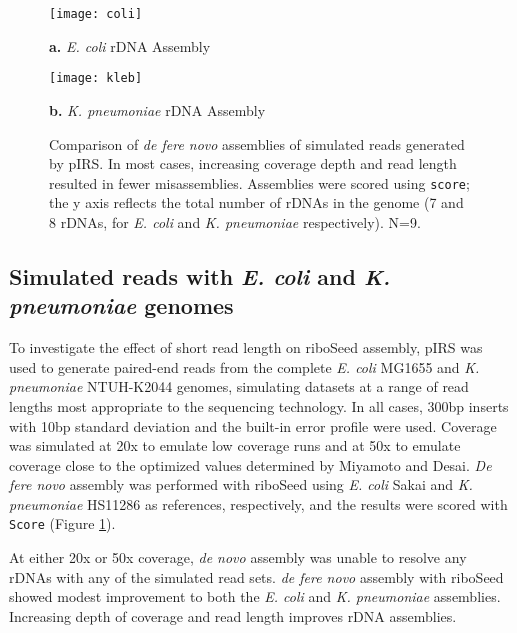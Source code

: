 \documentclass[a4,center,fleqn]{NAR}
\begin{document}
\begin{figure}[!ht]
  \centering
  \begin{minipage}{.45\textwidth}
    \centering
    \texttt{[image: coli]}

    {\footnotesize \textbf{a.} \textit{E. coli} rDNA Assembly}
    \label{fig:sim_coli}
  \end{minipage}

  \begin{minipage}{.45\textwidth}
    \centering
    \texttt{[image: kleb]} %

    {\footnotesize \textbf{b.} \textit{K. pneumoniae} rDNA Assembly}
    \label{fig:sim_kleb}
  \end{minipage}%
  \caption{Comparison of \textit{de fere novo} assemblies of simulated reads generated by pIRS. In most cases, increasing coverage depth and read length resulted in fewer misassemblies. Assemblies were scored using \texttt{score}; the y axis reflects the total number of rDNAs in the genome (7 and 8 rDNAs, for \textit{E. coli} and \textit{K. pneumoniae} respectively). N=9.}
  \label{fig:simreads}
\end{figure}


\subsection*{Simulated reads with \textit{E. coli} and \textit{K. pneumoniae} genomes}

To investigate the effect of short read length on riboSeed assembly, pIRS\cite{Hu2012} was used to generate paired-end reads from the complete \textit{E. coli} MG1655 and \textit{K. pneumoniae} NTUH-K2044 genomes, simulating datasets at a range of read lengths most appropriate to the sequencing technology. In all cases, 300bp inserts with 10bp standard deviation and the built-in error profile were used. Coverage was simulated at 20x to emulate low coverage runs and at 50x to emulate coverage close to the optimized values determined by Miyamoto\cite{Miyamoto2014} and Desai\cite{Desai2013}. \textit{De fere novo} assembly was performed with riboSeed using \textit{E. coli} Sakai and \textit{K. pneumoniae} HS11286 as references, respectively, and the results were scored with \texttt{Score} (Figure \ref{fig:simreads}).


At either 20x or 50x coverage, \textit{de novo} assembly was unable to resolve any rDNAs with any of the simulated read sets. \textit{de fere novo} assembly with riboSeed showed modest improvement to both the \textit{E. coli} and \textit{K. pneumoniae} assemblies. Increasing depth of coverage and read length improves rDNA assemblies.
\end{document}
